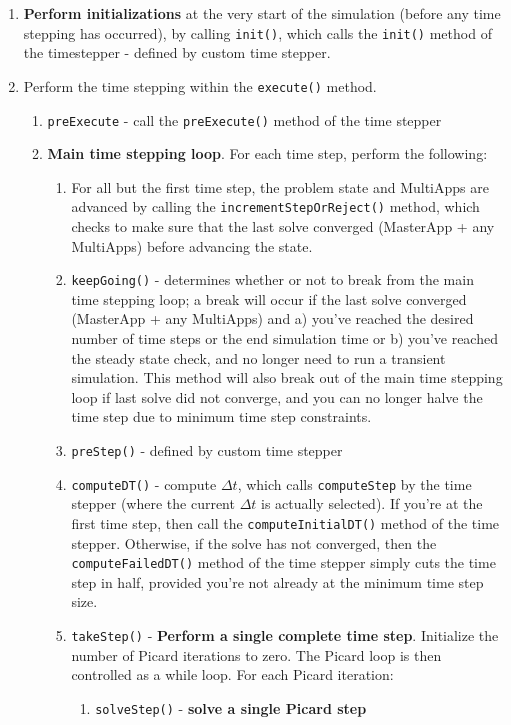 \documentclass[10pt]{article}
\numberwithin{equation}{section} %
\begin{document}
\begin{enumerate}
\item {\bf Perform initializations} at the very start of the simulation (before any time stepping has occurred), by calling {\tt init()}, which calls the {\tt init()} method of the timestepper - defined by custom time stepper. 
\item Perform the time stepping within the {\tt execute()} method.
	\begin{enumerate}
	\item {\tt preExecute} - call the {\tt preExecute()} method of the time stepper%
	\item {\bf Main time stepping loop}. For each time step, perform the following:
		\begin{enumerate}
		\item For all but the first time step, the problem state and MultiApps are advanced by calling the {\tt incrementStepOrReject()} method, which checks to make sure that the last solve converged (MasterApp + any MultiApps) before advancing the state.
		\item {\tt keepGoing()} - determines whether or not to break from the main time stepping loop; a break will occur if the last solve converged (MasterApp + any MultiApps) and a) you've reached the desired number of time steps or the end simulation time or b) you've reached the steady state check, and no longer need to run a transient simulation. This method will also break out of the main time stepping loop if last solve did not converge, and you can no longer halve the time step due to minimum time step constraints.
		\item {\tt preStep()}  - defined by custom time stepper
		\item {\tt computeDT()} - compute \(\Delta t\), which calls {\tt computeStep} by the time stepper (where the current \(\Delta t\) is actually selected). If you're at the first time step, then call the {\tt computeInitialDT()} method of the time stepper. Otherwise, if the solve has not converged, then the {\tt computeFailedDT()}  method of the time stepper simply cuts the time step in half, provided you're not  already at the minimum time step size.
		\item {\tt takeStep()} - {\bf Perform a single complete time step}. Initialize the number of Picard iterations to zero. The Picard loop is then controlled as a while loop. For each Picard iteration:
			\begin{enumerate}
			\item {\tt solveStep()}  - {\bf solve a single Picard step}

\end{enumerate}
\end{enumerate}
\end{enumerate}
\end{enumerate}
\end{document}
